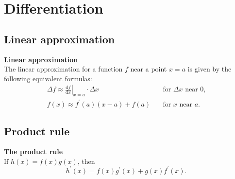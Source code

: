 \chapter{Differentiation}
\section{Linear approximation}
\textbf{Linear approximation}\\
\indent The linear approximation for a function \(f\) near a point \(x=a\) is given by the following equivalent formulas:
\begin{align*}
    \Delta f\approx\left.\frac{\mathrm{d}f}{\mathrm{d}x}\right|_{x=a}\cdot\Delta x & \quad\text{for \(\Delta x\) near \(0\),}\\
        f(x)\approx f^\prime (a)(x-a)+f(a) & \quad\text{for \(x\) near \(a\).}
\end{align*}

\section{Product rule}
\textbf{The product rule}\\
\indent If \(h(x)=f(x)g(x)\), then
\[
    h^\prime (x)=f(x)g^\prime (x)+g(x)f^\prime (x).
\]

